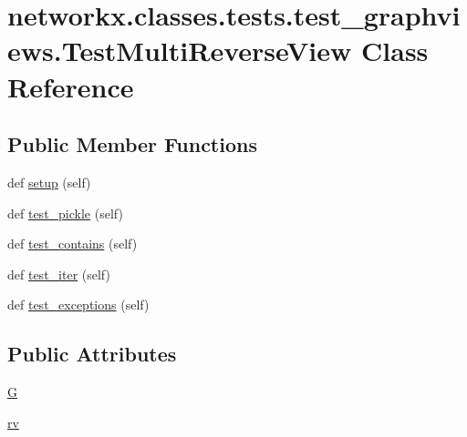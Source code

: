 \hypertarget{classnetworkx_1_1classes_1_1tests_1_1test__graphviews_1_1TestMultiReverseView}{}\section{networkx.\+classes.\+tests.\+test\+\_\+graphviews.\+Test\+Multi\+Reverse\+View Class Reference}
\label{classnetworkx_1_1classes_1_1tests_1_1test__graphviews_1_1TestMultiReverseView}
\subsection*{Public Member Functions}
\begin{DoxyCompactItemize}
\item 
def \hyperlink{classnetworkx_1_1classes_1_1tests_1_1test__graphviews_1_1TestMultiReverseView_aedee676d4dddb548fda99c876d6e48a9}{setup} (self)
\item 
def \hyperlink{classnetworkx_1_1classes_1_1tests_1_1test__graphviews_1_1TestMultiReverseView_af7228f417ebd9dd7398c8eb1da5c492e}{test\+\_\+pickle} (self)
\item 
def \hyperlink{classnetworkx_1_1classes_1_1tests_1_1test__graphviews_1_1TestMultiReverseView_a65d4b710117514c4a1d69d1918a8f1c0}{test\+\_\+contains} (self)
\item 
def \hyperlink{classnetworkx_1_1classes_1_1tests_1_1test__graphviews_1_1TestMultiReverseView_a4ac8232925f497176515d5e3a4b40dba}{test\+\_\+iter} (self)
\item 
def \hyperlink{classnetworkx_1_1classes_1_1tests_1_1test__graphviews_1_1TestMultiReverseView_a36e657b3eae79be878e62a724367bfc9}{test\+\_\+exceptions} (self)
\end{DoxyCompactItemize}
\subsection*{Public Attributes}
\begin{DoxyCompactItemize}
\item 
\hyperlink{classnetworkx_1_1classes_1_1tests_1_1test__graphviews_1_1TestMultiReverseView_ace3aa0cfa491f5246bae015f91215ad1}{G}
\item 
\hyperlink{classnetworkx_1_1classes_1_1tests_1_1test__graphviews_1_1TestMultiReverseView_adb86dd25c69402576671e7854125e674}{rv}
\end{DoxyCompactItemize}


